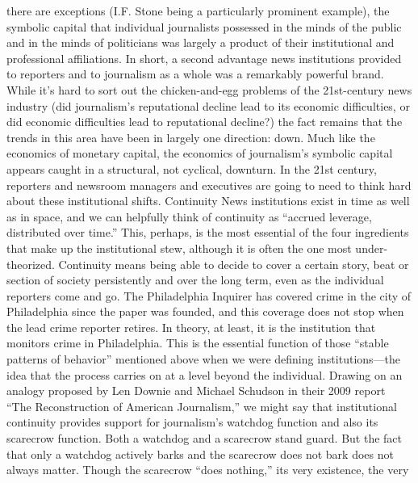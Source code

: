 there are exceptions (I.F. Stone being a particularly prominent example), the
symbolic capital that individual journalists possessed in the minds of the public
and in the minds of politicians was largely a product of their institutional and
professional affiliations.
In short, a second advantage news institutions provided to reporters and to journalism
as a whole was a remarkably powerful brand. While it’s hard to sort out the
chicken-and-egg problems of the 21st-century news industry (did journalism’s
reputational decline lead to its economic difficulties, or did economic difficulties
lead to reputational decline?) the fact remains that the trends in this area have been
in largely one direction: down. Much like the economics of monetary capital,
the economics of journalism’s symbolic capital appears caught in a structural, not
cyclical, downturn. In the 21st century, reporters and newsroom managers and
executives are going to need to think hard about these institutional shifts.
Continuity
News institutions exist in time as well as in space, and we can helpfully think
of continuity as ``accrued leverage, distributed over time.'' This, perhaps, is
the most essential of the four ingredients that make up the institutional stew,
although it is often the one most under-theorized. Continuity means being
able to decide to cover a certain story, beat or section of society persistently and
over the long term, even as the individual reporters come and go. The Philadelphia
Inquirer has covered crime in the city of Philadelphia since the paper was
founded, and this coverage does not stop when the lead crime reporter retires.
In theory, at least, it is the institution that monitors crime in Philadelphia. This
is the essential function of those ``stable patterns of behavior'' mentioned above
when we were defining institutions—the idea that the process carries on at a
level beyond the individual.
Drawing on an analogy proposed by Len Downie and Michael Schudson in their
2009 report ``The Reconstruction of American Journalism,'' we might say that
institutional continuity provides support for journalism’s watchdog function and
also its scarecrow function. Both a watchdog and a scarecrow stand guard. But the
fact that only a watchdog actively barks and the scarecrow does not bark does not
always matter. Though the scarecrow ``does nothing,'' its very existence, the very

